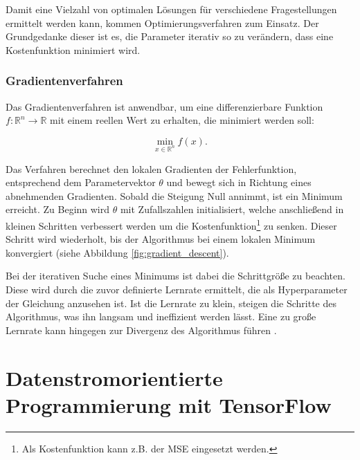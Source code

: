 Damit eine Vielzahl von optimalen Lösungen für verschiedene Fragestellungen ermittelt werden kann, kommen Optimierungsverfahren zum Einsatz. Der Grundgedanke dieser ist es, die Parameter iterativ so zu verändern, dass eine Kostenfunktion minimiert wird.

\subsubsection{Gradientenverfahren}
Das Gradientenverfahren ist anwendbar, um eine differenzierbare Funktion $f:\mathbb{R}^n \rightarrow\mathbb{R}$ mit einem reellen Wert zu erhalten, die minimiert werden soll:

\begin{equation}
	\min_{x\in\mathbb{R}^n} f(x).
\end{equation}

Das Verfahren berechnet den lokalen Gradienten der Fehlerfunktion, entsprechend dem Parametervektor $\theta$ und bewegt sich in Richtung eines abnehmenden Gradienten. Sobald die Steigung Null annimmt, ist ein Minimum erreicht. Zu Beginn wird $\theta$ mit Zufallszahlen initialisiert, welche anschließend in kleinen Schritten verbessert werden um die Kostenfunktion\footnote{Als Kostenfunktion kann z.B. der \ac{MSE} eingesetzt werden.} zu senken. Dieser Schritt wird wiederholt, bis der Algorithmus bei einem lokalen Minimum konvergiert \cite[112\psq]{Géron2017} (siehe Abbildung \ref{fig:gradient_descent}). 



Bei der iterativen Suche eines Minimums ist dabei die Schrittgröße zu beachten. Diese wird durch die zuvor definierte Lernrate ermittelt, die als \gls{Hyperparameter} der Gleichung anzusehen ist. Ist die Lernrate zu klein, steigen die Schritte des Algorithmus, was ihn langsam und ineffizient werden lässt. Eine zu große Lernrate kann hingegen zur Divergenz des Algorithmus führen \cite[114]{Géron2017}.


\section{Datenstromorientierte Programmierung mit TensorFlow}

